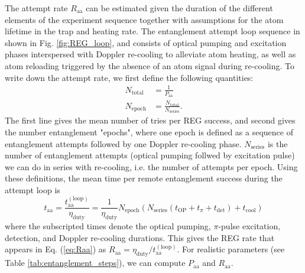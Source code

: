 The attempt rate $R_{\text{aa}}$ can be estimated given the duration of the different elements of the experiment sequence together with assumptions for the atom lifetime in the trap and heating rate. The entanglement attempt loop sequence in shown in Fig. \ref{fig:REG_loop}, and consists of optical pumping and excitation phases interspersed with Doppler re-cooling to alleviate atom heating, as well as atom reloading triggered by the absence of an atom signal during re-cooling. To write down the attempt rate, we first define the following quantities:
\begin{align}
    N_{\text{total}} &= \frac{1}{P_{\text{aa}}} \\
    N_{\text{epoch}} &= \frac{N_{\text{total}}}{N_{\text{series}}}.
\end{align}
The first line gives the mean number of tries per REG success, and second gives the number entanglement "epochs", where one epoch is defined as a sequence of entanglement attempts followed by one Doppler re-cooling phase. $N_{\text{series}}$ is the number of entanglement attempts (optical pumping follwed by excitation pulse) we can do in series with re-cooling, i.e. the number of attempts per epoch. Using these definitions, the mean time per remote entanglement success during the attempt loop is 
\begin{equation}
    t_{\text{aa}}=\frac{t_{\text{aa}}^{(\text{loop})}}{\eta_{\text{duty}}}=\frac{1}{\eta_{\text{duty}}}N_{\text{epoch}}\left(N_{\text{series}}\left(t_{\text{OP}} + t_{\pi} + t_{\text{det}}\right) + t_{\text{cool}}\right)
\end{equation}
where the subscripted times denote the optical pumping, $\pi$-pulse excitation, detection, and Doppler re-cooling durations. This gives the REG rate that appears in Eq. (\ref{eq:Raa}) as $R_{\text{aa}} = \eta_{\text{duty}}/t_{\text{aa}}^{(\text{loop})}$. For realistic parameters (see Table \ref{tab:entanglement_steps}), we can compute $P_{\text{aa}}$ and $R_{\text{aa}}$.

